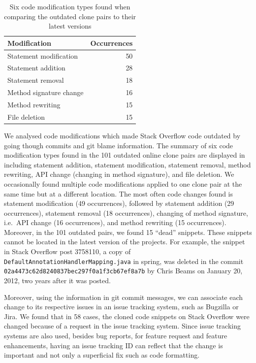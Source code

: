 \documentclass[10pt,journal,compsoc]{IEEEtran}
\begin{document}
\begin{table}
	\centering
	\caption{Six code modification types found when comparing the outdated clone pairs to their latest versions}
	\label{tab:mod_types}
		\begin{tabular}{lr}
			\toprule
			Modification & Occurrences \\
			\midrule
			Statement modification & 50 \\
			Statement addition & 28 \\
			Statement removal & 18 \\
			Method signature change & 16 \\
			Method rewriting & 15 \\
			File deletion & 15 \\
			\bottomrule 
		\end{tabular}
\end{table}

We analysed code modifications which made Stack Overflow code outdated by going
though commits and git blame information. The summary of six code modification
types found in the 101 outdated online clone pairs are displayed in
 including statement addition, statement modification,
statement removal, method rewriting, API change (changing in method signature),
and file deletion. We occasionally found multiple code modifications applied to
one clone pair at the same time but at a different location. The most often code
changes found is statement modification (49 occurrences), followed by statement
addition (29 occurrences), statement removal (18 occurrences), changing of
method signature, i.e.~API change (16 occurrences), and method rewriting (15
occurrences). Moreover, in the 101 outdated pairs, we found 15 ``dead''
snippets. These snippets cannot be located in the latest version of the
projects. For example, the snippet in Stack Overflow post 3758110, a copy of
{\small{\texttt{DefaultAnnotationHandlerMapping.java}}} in \textsf{spring}, was
deleted in the commit
{\small{\texttt{02a4473c62d8240837bec297f0a1f3cb67ef8a7b}}} by Chris Beams on
January 20, 2012, two years after it was posted.

Moreover, using the information in git commit messages, we can associate each
change to its respective issues in an issue tracking system, such as Bugzilla or
Jira. We found that in 58 cases, the cloned code snippets on Stack Overflow were
changed because of a request in the issue tracking system. Since issue tracking
systems are also used, besides bug reports, for feature request and feature
enhancements, having an issue tracking ID can reflect that the change is important
and not only a superficial fix such as code formatting.
\end{document}
